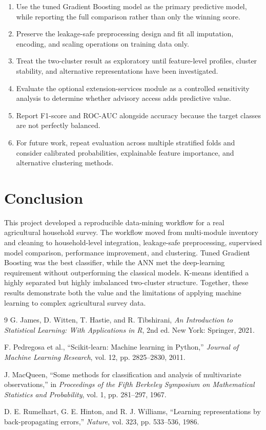 \documentclass[12pt,a4paper]{article}
\begin{document}
\begin{enumerate}[leftmargin=2em]
    \item Use the tuned Gradient Boosting model as the primary predictive model, while reporting the full comparison rather than only the winning score.
    \item Preserve the leakage-safe preprocessing design and fit all imputation, encoding, and scaling operations on training data only.
    \item Treat the two-cluster result as exploratory until feature-level profiles, cluster stability, and alternative representations have been investigated.
    \item Evaluate the optional extension-services module as a controlled sensitivity analysis to determine whether advisory access adds predictive value.
    \item Report F1-score and ROC-AUC alongside accuracy because the target classes are not perfectly balanced.
    \item For future work, repeat evaluation across multiple stratified folds and consider calibrated probabilities, explainable feature importance, and alternative clustering methods.
\end{enumerate}

\section{Conclusion}

This project developed a reproducible data-mining workflow for a real agricultural household survey. The workflow moved from multi-module inventory and cleaning to household-level integration, leakage-safe preprocessing, supervised model comparison, performance improvement, and clustering. Tuned Gradient Boosting was the best classifier, while the ANN met the deep-learning requirement without outperforming the classical models. K-means identified a highly separated but highly imbalanced two-cluster structure. Together, these results demonstrate both the value and the limitations of applying machine learning to complex agricultural survey data.

\begin{thebibliography}{9}
G. James, D. Witten, T. Hastie, and R. Tibshirani, \textit{An Introduction to Statistical Learning: With Applications in R}, 2nd ed. New York: Springer, 2021.

F. Pedregosa et al., ``Scikit-learn: Machine learning in Python,'' \textit{Journal of Machine Learning Research}, vol. 12, pp. 2825--2830, 2011.

J. MacQueen, ``Some methods for classification and analysis of multivariate observations,'' in \textit{Proceedings of the Fifth Berkeley Symposium on Mathematical Statistics and Probability}, vol. 1, pp. 281--297, 1967.

D. E. Rumelhart, G. E. Hinton, and R. J. Williams, ``Learning representations by back-propagating errors,'' \textit{Nature}, vol. 323, pp. 533--536, 1986.
\end{thebibliography}
\end{document}
